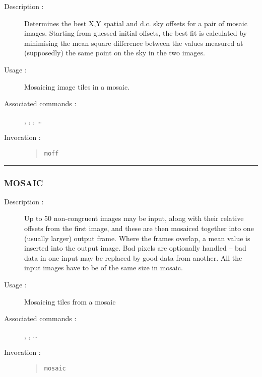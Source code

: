 \begin{description}

\item[Description :] Determines the best X,Y spatial and
d.c. sky offsets for a pair of mosaic images.  Starting from guessed
initial offsets, the best fit is calculated by minimising the mean
square difference between the values measured at (supposedly) the same
point on the sky in the two images.

\item[Usage :] Mosaicing image tiles in a mosaic.

\item[Associated commands :] {\tt {}}, 
{\tt {}}, {\tt {}}, 
{\tt {}} \ldots

\item[Invocation :]

\begin{quote}{\tt  moff }\end{quote}

\end{description}

\hrule 
\subsubsection*{\label{MOSAIC}MOSAIC}

\begin{description}

\item[Description :] Up to 50 non-congruent images may be input, along
with their relative offsets from the first image, and these are then
mosaiced together into one (usually larger) output frame. Where the
frames overlap, a mean value is inserted into the output image. Bad
pixels are optionally handled -- bad data in one input may be replaced
by good data from another.  All the input images have to be of the same
size in mosaic.

\item[Usage :] Mosaicing tiles from a mosaic

\item[Associated commands :] {\tt {}}, 
{\tt {}}, {\tt {}} \ldots 

\item[Invocation :]

\begin{quote}{\tt  mosaic }\end{quote}

\end{description}

